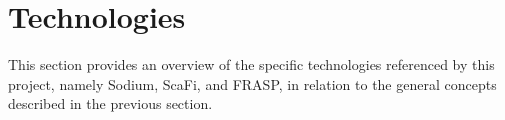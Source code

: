 
\section{Technologies}
\label{section:background:technologies}

This section provides an overview of the specific technologies referenced by
this project, namely Sodium, ScaFi, and FRASP, in relation to the general
concepts described in the previous section.




